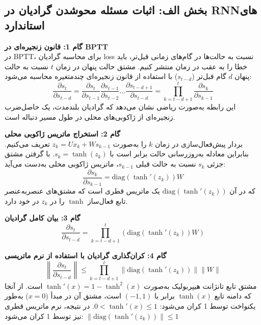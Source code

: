 \documentclass[12pt,a4paper]{article}
\begin{document}
	\subsection{بخش الف: اثبات مسئله محوشدن گرادیان در RNNهای استاندارد}
	
	\begin{tcolorbox}[colback=softgreen,colframe=mygreen,title=\textbf{اثبات و استدلال ریاضی}]
		\textbf{گام 1: قانون زنجیره‌ای در BPTT} \\
		در BPTT، برای محاسبه گرادیان loss نسبت به حالت‌ها در گام‌های زمانی قبل‌تر، باید خطا را به عقب در زمان منتشر کنیم. مشتق حالت پنهان در زمان $t$ نسبت به حالت پنهان $d$ گام قبل‌تر ($s_{t-d}$) با استفاده از قانون زنجیره‌ای چندمتغیره محاسبه می‌شود:
		\begin{equation}
			\frac{\partial s_t}{\partial s_{t-d}} = \frac{\partial s_t}{\partial s_{t-1}} \frac{\partial s_{t-1}}{\partial s_{t-2}} \dots \frac{\partial s_{t-d+1}}{\partial s_{t-d}} = \prod_{k=t-d+1}^{t} \frac{\partial s_k}{\partial s_{k-1}}
		\end{equation}
		این رابطه به‌صورت ریاضی نشان می‌دهد که گرادیان بلندمدت، یک حاصل‌ضرب زنجیره‌ای از ژاکوبی‌های محلی در طول مسیر دنباله است.
		
		\textbf{گام 2: استخراج ماتریس ژاکوبی محلی} \\
		بردار پیش‌فعال‌سازی در زمان $k$ را به‌صورت $z_k = Ux_k + Ws_{k-1}$ تعریف می‌کنیم. بنابراین معادله به‌روزرسانی حالت برابر است با $s_k = \tanh(z_k)$. با گرفتن مشتق جزئی $s_k$ نسبت به حالت قبلی $s_{k-1}$، ماتریس ژاکوبی محلی به‌دست می‌آید:
		\begin{equation}
			\frac{\partial s_k}{\partial s_{k-1}} = \text{diag}(\tanh'(z_k)) W
		\end{equation}
		که در آن $\text{diag}(\tanh'(z_k))$ یک ماتریس قطری است که مشتق‌های عنصر‌به‌عنصر تابع فعال‌ساز $\tanh$ را در $z_k$ در خود دارد.
		
		\textbf{گام 3: بیان کامل گرادیان}
		\begin{equation}
			\frac{\partial s_t}{\partial s_{t-d}} = \prod_{k=t-d+1}^{t} \left( \text{diag}(\tanh'(z_k)) W \right)
		\end{equation}
		
		\textbf{گام 4: کران‌گذاری گرادیان با استفاده از نرم ماتریسی}
		\begin{equation}
			\left\| \frac{\partial s_t}{\partial s_{t-d}} \right\| \leq \prod_{k=t-d+1}^{t} \left\| \text{diag}(\tanh'(z_k)) \right\| \| W \|
		\end{equation}
		مشتق تابع تانژانت هیپربولیک به‌صورت $\tanh'(x) = 1 - \tanh^2(x)$ است. از آنجا که دامنه تابع $\tanh(x)$ برابر با $(-1, 1)$ است، مشتق آن در مبدأ ($x=0$) به‌طور یکنواخت توسط 1 کران می‌شود: $0 < \tanh'(x) \leq 1$. در نتیجه، نرم ماتریس قطری نیز توسط 1 کران می‌شود: $\left\| \text{diag}(\tanh'(z_k)) \right\| \leq 1$
		

\end{tcolorbox}
\end{document}
